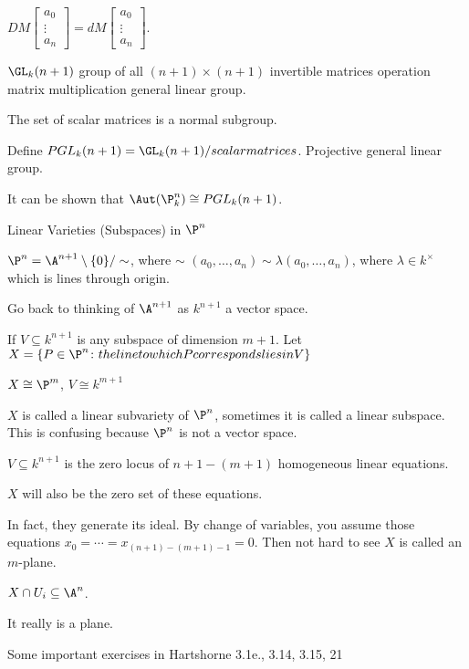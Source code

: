 $DM \begin{bmatrix} a_0 \\ \vdots \\ a_n \end{bmatrix}= dM \begin{bmatrix} a_0 \\ \vdots \\ a_n \end{bmatrix}$.

$\GL_k(n+1)$ group of all $(n+1) \times (n+1)$ invertible matrices operation matrix multiplication general linear group. 

The set of scalar matrices is a normal subgroup. 

Define $PGL_k(n+1)= \GL_k(n+1)/scalar matrices$. Projective general linear group. 

It can be shown that $\Aut(\P^n_k) \cong PGL_k(n+1)$.

Linear Varieties (Subspaces) in $\P^n$

$\P^n= \A^{n+1} \setminus \{0\} /\sim$, where $\sim$ $(a_0,\ldots,a_n) \sim \lambda (a_0,\ldots,a_n)$, where $\lambda \in k^\times$ which is lines through origin. 

Go back to thinking of $\A^{n+1}$ as $k^{n+1}$ a vector space. 


If $V \subseteq k^{n+1}$ is any subspace of dimension $m+1$. Let $X= \{ P \in \P^n \colon the line to which P corresponds lies in V\}$

$X \cong \P^m$, $V \cong k^{m+1}$

$X$ is called a linear subvariety of $\P^n$, sometimes it is called a linear subspace. This is confusing because $\P^n$ is not a vector space. 

$V \subseteq k^{n+1}$ is the zero locus of $n+1-(m+1)$ homogeneous linear equations.

$X$ will also be the zero set of these equations. 

In fact, they generate its ideal. By change of variables, you assume those equations $x_0= \cdots= x_{(n+1)-(m+1)-1}=0$. Then not hard to see $X$ is called an $m$-plane.

$X \cap U_i \subseteq \A^n$. 

It really is a plane.

Some important exercises in Hartshorne 3.1e., 3.14, 3.15, 21






